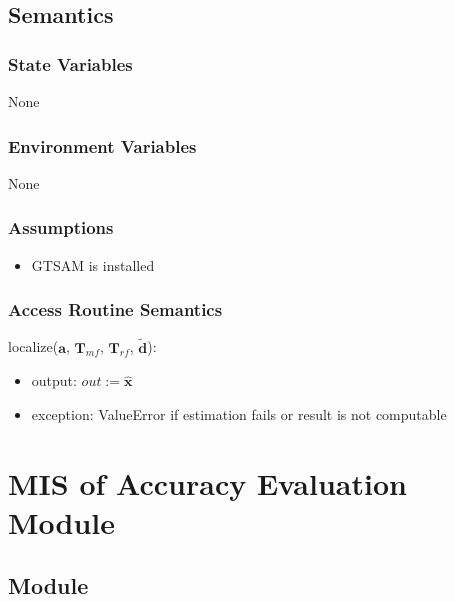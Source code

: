 \documentclass[12pt, titlepage]{article}
\begin{document}
\subsection{Semantics}

\subsubsection{State Variables}
None

\subsubsection{Environment Variables}
None

\subsubsection{Assumptions}
\begin{itemize}
  \item GTSAM is installed
\end{itemize}

\subsubsection{Access Routine Semantics}

\noindent localize($\mathbf{a}$, $\mathbf{T}_{mf}$, $\mathbf{T}_{rf}$, $\mathbf{\tilde{d}}$):
\begin{itemize}
\item output: $out:= \mathbf{\hat{x}}$
\item exception: ValueError if estimation fails or result is not computable
\end{itemize}

\newpage

\section{MIS of Accuracy Evaluation Module} \label{M_Accurate}

\subsection{Module}
\end{document}
